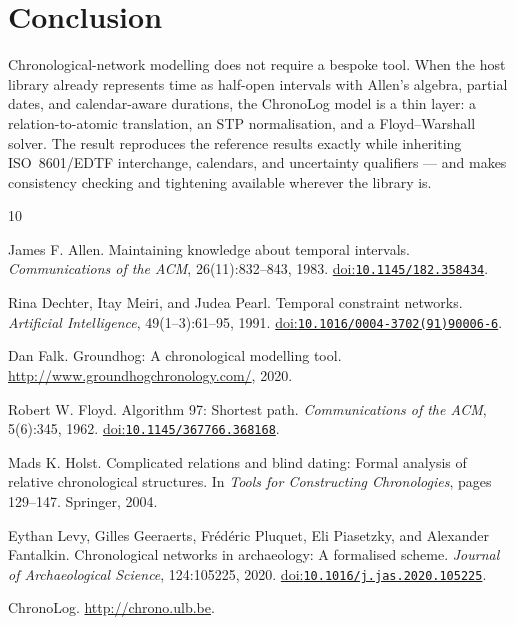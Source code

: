 \documentclass[a4paper,USenglish,cleveref,autoref,thm-restate]{oasics-v2021}
\providecommand{\doi}[1]{\href{https://doi.org/#1}{doi:\texttt{#1}}}
\begin{document}
\section{Conclusion}

Chronological-network modelling does not require a bespoke tool. When the
host library already represents time as half-open intervals with Allen's
algebra, partial dates, and calendar-aware durations, the ChronoLog
model is a thin layer: a relation-to-atomic translation, an STP
normalisation, and a Floyd--Warshall solver. The result reproduces the
reference results exactly while inheriting ISO~8601/EDTF interchange,
calendars, and uncertainty qualifiers --- and makes consistency checking
and tightening available wherever the library is.

%
%
\begin{thebibliography}{10}

James F. Allen.
\newblock Maintaining knowledge about temporal intervals.
\newblock \emph{Communications of the ACM}, 26(11):832--843, 1983.
\newblock \doi{10.1145/182.358434}.

Rina Dechter, Itay Meiri, and Judea Pearl.
\newblock Temporal constraint networks.
\newblock \emph{Artificial Intelligence}, 49(1--3):61--95, 1991.
\newblock \doi{10.1016/0004-3702(91)90006-6}.

Dan Falk.
\newblock Groundhog: A chronological modelling tool.
\newblock \url{http://www.groundhogchronology.com/}, 2020.

Robert W. Floyd.
\newblock Algorithm 97: Shortest path.
\newblock \emph{Communications of the ACM}, 5(6):345, 1962.
\newblock \doi{10.1145/367766.368168}.

Mads K. Holst.
\newblock Complicated relations and blind dating: Formal analysis of
  relative chronological structures.
\newblock In \emph{Tools for Constructing Chronologies}, pages 129--147.
  Springer, 2004.

Eythan Levy, Gilles Geeraerts, Fr\'ed\'eric Pluquet, Eli Piasetzky, and
  Alexander Fantalkin.
\newblock Chronological networks in archaeology: A formalised scheme.
\newblock \emph{Journal of Archaeological Science}, 124:105225, 2020.
\newblock \doi{10.1016/j.jas.2020.105225}.

ChronoLog.
\newblock \url{http://chrono.ulb.be}.

\end{thebibliography}
\end{document}
